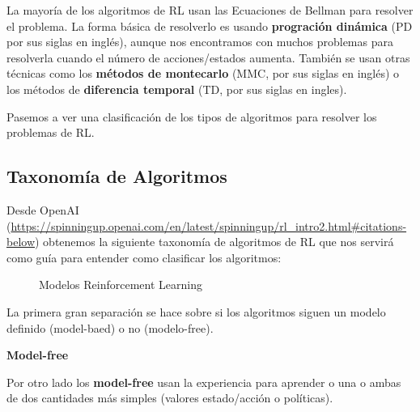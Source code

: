 \documentclass[
  a4paper,
  DIV=11,
  numbers=noendperiod]{scrreprt}
\begin{document}
La mayoría de los algoritmos de RL usan las Ecuaciones de Bellman para
resolver el problema. La forma básica de resolverlo es usando
\textbf{progración dinámica} (PD por sus siglas en inglés), aunque nos
encontramos con muchos problemas para resolverla cuando el número de
acciones/estados aumenta. También se usan otras técnicas como los
\textbf{métodos de montecarlo} (MMC, por sus siglas en inglés) o los
métodos de \textbf{diferencia temporal} (TD, por sus siglas en ingles).

Pasemos a ver una clasificación de los tipos de algoritmos para resolver
los problemas de RL.

\subsection{Taxonomía de Algoritmos}\label{taxonomuxeda-de-algoritmos}

Desde OpenAI
(\url{https://spinningup.openai.com/en/latest/spinningup/rl_intro2.html\#citations-below})
obtenemos la siguiente taxonomía de algoritmos de RL que nos servirá
como guía para entender como clasificar los algoritmos:

\begin{figure}


\caption{\label{fig-rl_algorithms}Modelos Reinforcement Learning}

\end{figure}%

La primera gran separación se hace sobre si los algoritmos siguen un
modelo definido (model-baed) o no (modelo-free).

\textbf{Model-free}

Por otro lado los \textbf{model-free} usan la experiencia para aprender
o una o ambas de dos cantidades más simples (valores estado/acción o
políticas).
\end{document}
